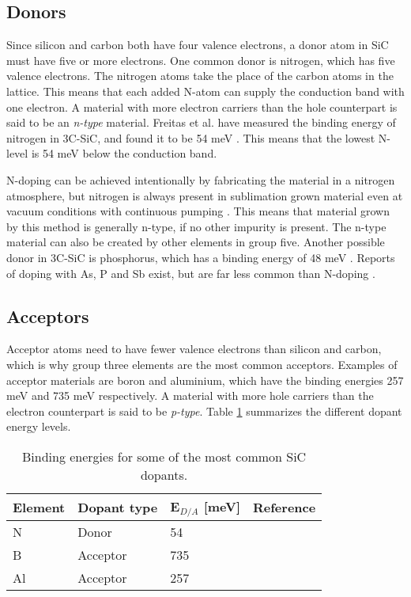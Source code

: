 \subsection{Donors}
Since silicon and carbon both have four valence electrons, a donor atom in SiC must have five or more electrons. One common donor is nitrogen, which has five valence electrons. The nitrogen atoms take the place of the carbon atoms in the lattice. This means that each added N-atom can supply the conduction band with one electron. A material with more electron carriers than the hole counterpart is said to be an \emph{n-type} material. Freitas et al. have measured the binding energy of nitrogen in 3C-SiC, and found it to be 54 meV \cite{Freitas1988}. This means that the lowest N-level is 54 meV below the conduction band.

N-doping can be achieved intentionally by fabricating the material in a nitrogen atmosphere, but nitrogen is always present in sublimation grown material even at vacuum conditions with continuous pumping \cite{Sun2012b}. This means that material grown by this method is generally n-type, if no other impurity is present. The n-type material can also be created by other elements in group five.  Another possible donor in 3C-SiC is phosphorus, which has a binding energy of 48 meV \cite{Ivanov2010}. Reports of doping with As, P and Sb exist, but are far less common than N-doping \cite{Rao1999}. 

\subsection{Acceptors}
Acceptor atoms need to have fewer valence electrons than silicon and carbon, which is why group three elements are the most common acceptors. Examples of acceptor materials are boron and aluminium, which have the binding energies 257 meV \cite{Freitas1988} and 735 meV \cite{Richards2003} respectively. A material with more hole carriers than the electron counterpart is said to be \emph{p-type}. Table \ref{tab:dopants} summarizes the different dopant energy levels. 

\begin{table}[h]
\caption{Binding energies for some of the most common SiC dopants.}
\label{tab:dopants}
\begin{center}
\begin{tabular}{ l l l r}
  \hline                       
  \hline       
  \vspace{1mm}
    Element  & Dopant type & E$_{D/A}$ [meV] & Reference\\
    \hline
  N &  Donor & 54 & \cite{Freitas1988}\\
  B &  Acceptor & 735 & \cite{Richards2003}\\
  Al &  Acceptor & 257  & \cite{Freitas1988}\\
  \hline  
\end{tabular}
\end{center}
\end{table}

